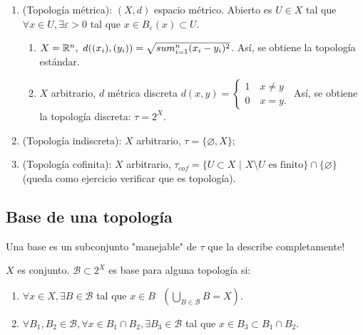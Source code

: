 	\begin{eg} \text{}
		\begin{enumerate}
			\item (Topología métrica): $(X,d)$ espacio métrico. Abierto es $U \in X$ tal que $\forall x \in U, \exists \varepsilon > 0$ tal que $x \in B_{\varepsilon} (x) \subset U$.
			\begin{enumerate}
				\item $X = \mathbb{R}^n, \text{ } d((x_i),(y_i)) = \sqrt{ \\sum_{i=1}^{n} (x_i - y_i)^2 }$. Así, se obtiene la topología estándar.

				\item $X$ arbitrario, $d$ métrica discreta $d(x,y) = \begin{cases}
					1 \quad x \neq y \\
					0 \quad x = y.
				\end{cases}$ Así, se obtiene la topología discreta: $\tau = 2^X$.
			\end{enumerate}

			\item (Topología indiscreta): $X$ arbitrario, $\tau = \{ \varnothing , X \}$;

			\item (Topología cofinita): $X$ arbitrario, $\tau_{cof} = \{ U \subset X \text{ | } X \setminus U \text{ es finito} \} \cap \{ \varnothing \}$ (queda como ejercicio verificar que es topología).
		\end{enumerate}
	\end{eg}

	\subsection{Base de una topología}

	Una base es un subconjunto "manejable" de $\tau$ que la describe completamente!

	\begin{definition}[base]
		$X$ es conjunto. $\mathcal{B} \subset 2^X$ es base para alguna topología si:
		\begin{enumerate}
			\item $\forall x \in X, \exists B \in \mathcal{B}$ tal que $x \in B \text{ } \left( \bigcup_{B \in \mathcal{B}} B = X \right)$.

			\item $\forall B_1, B_2 \in \mathcal{B}, \forall x \in B_1 \cap B_2, \exists B_3 \in \mathcal{B}$ tal que $x \in B_3 \subset B_1 \cap B_2$.
		\end{enumerate}
	\end{definition}

